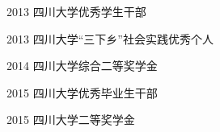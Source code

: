 



\begin{cvhonors}



\cvhonor
{2013} %
{四川大学优秀学生干部} %

\cvhonor
{2013} %
{四川大学“三下乡”社会实践优秀个人} %

\cvhonor
{2014} %
{四川大学综合二等奖学金} %

\cvhonor
{2015} %
{四川大学优秀毕业生干部} %

\cvhonor
{2015} %
{四川大学二等奖学金} %


\end{cvhonors}